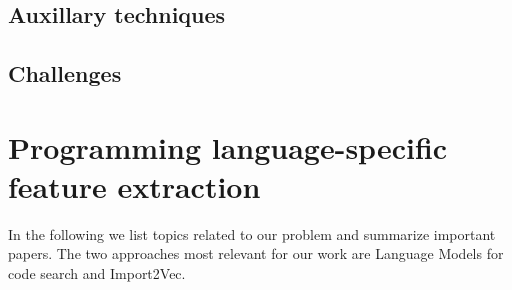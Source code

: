 \documentclass[longabstract,mgr,english]{iithesis}
\begin{document}
\subsection{Auxillary techniques}

\subsection{Challenges}

\section{Programming language-specific feature extraction}

In the following we list topics related to our problem and summarize important papers.
The two approaches most relevant for our work are Language Models for code search and Import2Vec.
\end{document}
